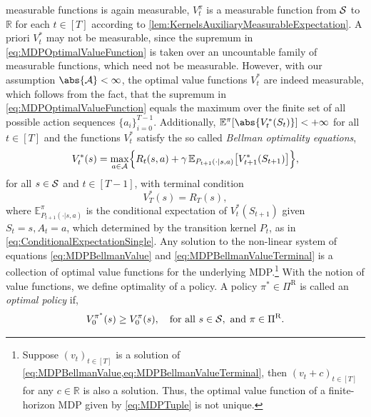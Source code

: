 \documentclass[
    a4paper,
    11pt,
    bibliography=totoc,
    listof=totoc,      
    headinclude=true,
    cleardoublepage=empty,
]{scrbook}
\theoremstyle{plain}
\theoremstyle{definition}
\theoremstyle{remark}
\newcommand{\SetR}{\mathbb R}
\newcommand{\E}{\mathbb E}
\newcommand{\SpaceS}{{\cal S}}
\newcommand{\SpaceA}{{\cal A}}
\begin{document}
measurable functions is again measurable, $V_t^\pi$ is a measurable function 
from $\SpaceS$ to $\SetR$ for each $t\in[T]$ according to
\cref{lem:KernelsAuxiliaryMeasurableExpectation}. A priori $V^*_t$ may not be
measurable, since the supremum in \eqref{eq:MDPOptimalValueFunction} is taken
over an uncountable family of measurable functions, which need not be
measurable.
However, with our assumption $\abs{\SpaceA}<\infty$, the optimal value
functions $V^*_t$ are indeed measurable, which follows from the fact, that the
supremum in \eqref{eq:MDPOptimalValueFunction} equals the maximum over the 
finite set of all possible action sequences $\{a_i\}_{i=0}^{T-1}$.
Additionally, $\E^\pi[\abs{V_t^*(S_t)}]<+\infty$ for all $t\in[T]$ and the 
functions $V^*_t$ satisfy the so called \textit{Bellman optimality equations},
\begin{equation}
\label{eq:MDPBellmanValue}
    V^*_t(s) 
    = \max_{a\in\SpaceA} \Bigl\{ 
        R_t(s,a) + \gamma\, \E_{P_{t+1}(\cdot|s,a)}\bigl[V^*_{t+1}(S_{t+1})\bigr] 
    \Bigr\},
\end{equation}
for all $s\in\SpaceS$ and $t\in[T-1]$, with terminal condition 
\begin{equation}
\label{eq:MDPBellmanValueTerminal}
    V^*_T(s) = R_T(s),
\end{equation}
where $\E^\pi_{P_{t+1}(\cdot|s,a)}$ is the conditional expectation of 
$V^*_t(S_{t+1})$ given $S_t=s, A_t=a$, which determined by the transition 
kernel $P_t$, as in \cref{eq:ConditionalExpectationSingle}. Any solution to 
the non-linear system of equations \eqref{eq:MDPBellmanValue} and 
\eqref{eq:MDPBellmanValueTerminal} is a collection of optimal value functions 
for the underlying MDP.\footnote{
    Suppose $(v_t)_{t\in[T]}$ is a solution of 
    \cref{eq:MDPBellmanValue,eq:MDPBellmanValueTerminal}, then 
    $(v_t+c)_{t\in[T]}$ for any $c\in\SetR$ is also a solution. Thus, the 
    optimal value function of a finite-horizon MDP given by \cref{eq:MDPTuple} 
    is not unique.
}
With the notion of value functions, we define optimality of a policy. A 
policy $\pi^*\in\Pi^\text{R}$ is called an \textit{optimal policy} if,
\begin{equation}
\label{eq:MDPOptimalPolicy}
    V_0^{\pi^*}(s) \geq V_0^\pi(s), 
    \quad \text{for all } s\in\SpaceS, \text{ and }\pi\in\Pi^\text{R}.
\end{equation}
\end{document}

